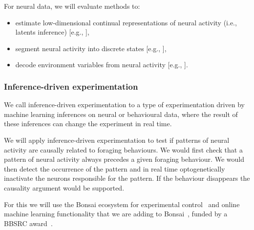 For neural data, we will evaluate methods to:

\begin{itemize}

    \item estimate low-dimensional continual representations of
        neural activity (i.e., latents inference)
        [e.g.,
        \cite{mackeEtAl11,dunckerAndSahani18,walkerEtAl23,pandarinathEtAl18,saniEtAl21}],

    \item segment neural activity into discrete states
        [e.g., \cite{chenEtAl09,escolaEtAl11}],

    \item decode environment variables from neural activity
        [e.g., \cite{dengEtAl15,kloostermanEtAl14,tampuuEtAl19}].

\end{itemize}


\subsubsection{Inference-driven experimentation}

We call inference-driven experimentation to a type of experimentation driven by
machine learning inferences on neural or behavioural data, where the result of
these inferences can change the experiment in real time.

We will apply inference-driven experimentation to test if patterns of neural
activity are causally related to foraging behaviours.
%
We would first check that a pattern of neural activity always precedes a given
foraging behaviour. We would then detect the occurrence of the pattern and in
real time optogenetically inactivate the neurons responsible for the pattern.
%
If the behaviour disappears the causality argument would be supported.

For this we will use the Bonsai ecosystem for experimental
control~\cite{bonsai} and online machine learning functionality that we are
adding to Bonsai~\cite{bonsaiML}, funded by a BBSRC award~\cite{bbsrcAward}.

